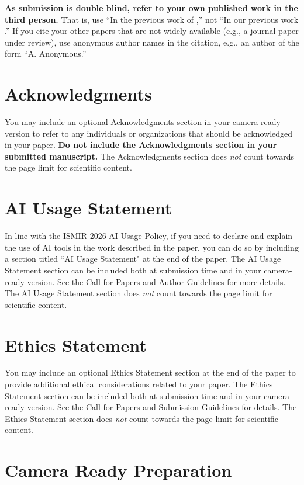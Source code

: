 \documentclass{article}
\begin{document}
\textbf{As submission is double blind, refer to your own published work in the third person.} That is, use ``In the previous work of \cite{ISMIR17Author:01},'' not ``In our previous work \cite{ISMIR17Author:01}.'' If you cite your other papers that are not widely available (e.g., a journal paper under review), use anonymous author names in the citation, e.g., an author of the form ``A. Anonymous.''

\section{Acknowledgments}

You may include an optional Acknowledgments section in your camera-ready version to refer to any individuals or organizations that should be acknowledged in your paper. \textbf{Do not include the Acknowledgments section in your submitted manuscript.} The Acknowledgments section does \textit{not} count towards the page limit for scientific content.

\section{AI Usage Statement}

In line with the ISMIR 2026 AI Usage Policy, if you need to declare and explain the use of AI tools in the work described in the paper, you can do so by including a section titled ``AI Usage Statement" at the end of the paper. The AI Usage Statement section can be included both at submission time and in your camera-ready version. See the Call for Papers and Author Guidelines for more details. The AI Usage Statement section does \textit{not} count towards the page limit for scientific content. 

\section{Ethics Statement}

You may include an optional Ethics Statement section at the end of the paper to provide additional ethical considerations related to your paper. The Ethics Statement section can be included both at submission time and in your camera-ready version. See the Call for Papers and Submission Guidelines for details. The Ethics Statement section does \textit{not} count towards the page limit for scientific content.

\section{Camera Ready Preparation}\label{sec:cameraready}
\end{document}

